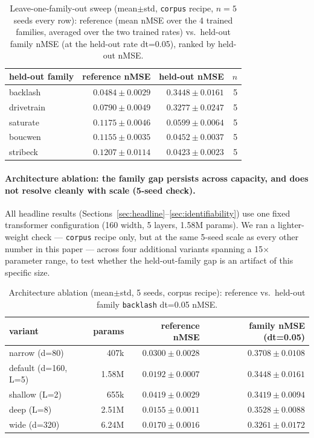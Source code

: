 \documentclass{article}
\begin{document}
\begin{table}[h]
  \caption{Leave-one-family-out sweep (mean$\pm$std, \texttt{corpus} recipe,
  $n=5$ seeds every row): reference (mean nMSE over the 4 trained families,
  averaged over the two trained rates) vs.\ held-out family nMSE (at the
  held-out rate dt=0.05), ranked by held-out nMSE.}
  \label{tab:loo}
  \centering
  \small
  \begin{tabular}{lrrr}
    \toprule
    held-out family & reference nMSE & held-out nMSE & $n$ \\
    \midrule
    backlash & $0.0484\pm0.0029$ & $0.3448\pm0.0161$ & 5 \\
    drivetrain & $0.0790\pm0.0049$ & $0.3277\pm0.0247$ & 5 \\
    saturate & $0.1175\pm0.0046$ & $0.0599\pm0.0064$ & 5 \\
    boucwen & $0.1155\pm0.0035$ & $0.0452\pm0.0037$ & 5 \\
    stribeck & $0.1207\pm0.0114$ & $0.0423\pm0.0023$ & 5 \\
    \bottomrule
  \end{tabular}
\end{table}

\paragraph{Architecture ablation: the family gap persists across capacity, and does not resolve cleanly with scale (5-seed check).}
All headline results (Sections~\ref{sec:headline}--\ref{sec:identifiability}) use one
fixed transformer configuration (160 width, 5 layers, 1.58M params). We ran a
lighter-weight check --- \texttt{corpus} recipe only, but at the same 5-seed
scale as every other number in this paper --- across four additional variants
spanning a 15$\times$ parameter range, to test whether the held-out-family gap
is an artifact of this specific size.

\begin{table}[h]
  \caption{Architecture ablation (mean$\pm$std, 5 seeds, corpus recipe):
  reference vs.\ held-out family \texttt{backlash} dt=0.05 nMSE.}
  \label{tab:ablation}
  \centering
  \small
  \begin{tabular}{lrrr}
    \toprule
    variant & params & reference nMSE & family nMSE (dt=0.05) \\
    \midrule
    narrow (d=80) & 407k & $0.0300\pm0.0028$ & $0.3708\pm0.0108$ \\
    default (d=160, L=5) & 1.58M & $0.0192\pm0.0007$ & $0.3448\pm0.0161$ \\
    shallow (L=2) & 655k & $0.0419\pm0.0029$ & $0.3419\pm0.0094$ \\
    deep (L=8) & 2.51M & $0.0155\pm0.0011$ & $0.3528\pm0.0088$ \\
    wide (d=320) & 6.24M & $0.0170\pm0.0016$ & $0.3261\pm0.0172$ \\
    \bottomrule
  \end{tabular}
\end{table}
\end{document}
